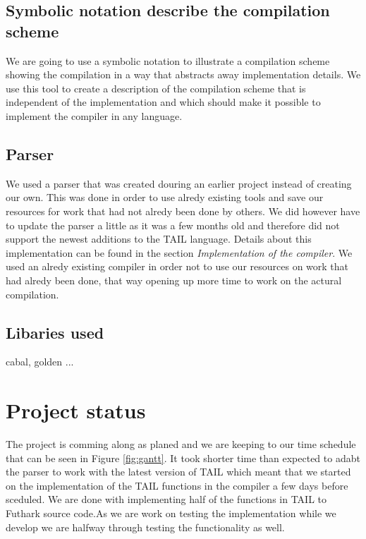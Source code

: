 \documentclass[11pt]{article}
\begin{document}
\subsection{Symbolic notation describe the compilation scheme}
We are going to use a symbolic notation to illustrate a compilation scheme showing the compilation in a way that abstracts away implementation details. We use this tool to create a description of the compilation scheme that is independent of the implementation and which should make it possible to implement the compiler in any language.

\subsection{Parser}
We used a parser that was created douring an earlier project \cite{APLACC} instead of creating our own. This was done in order to use alredy existing tools and save our resources for work that had not alredy been done by others. We did however have to update the parser a little as it was a few months old and therefore did not support the newest additions to the TAIL language. Details about this implementation can be found in the section \textit{Implementation of the compiler}. 
We used an alredy existing compiler in order not to use our resources on work that had alredy been done, that way opening up more time to work on the actural compilation.

\subsection{Libaries used}
cabal, golden ...

\section{Project status}
The project is comming along as planed and we are keeping to our time schedule that can be seen in Figure \ref{fig:gantt}.
It took shorter time than expected to adabt the parser to work with the latest version of TAIL
which meant that we started on the implementation of the TAIL functions in the compiler a few days before sceduled. 
We are done with implementing half of the functions in TAIL to Futhark source code.As we are work on testing the
implementation while we develop we are halfway through testing the functionality as well. 
\end{document}
